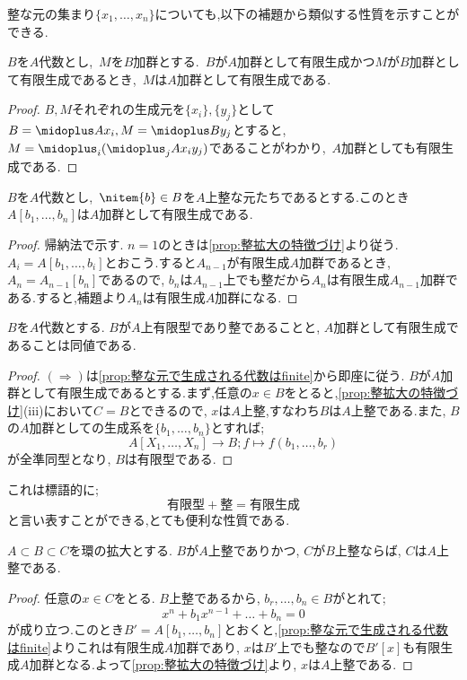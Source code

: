 整な元の集まり$\{x_1,\dots,x_n\}$についても,以下の補題から類似する性質を示すことができる.
\begin{lem}
	$B$を$A$代数とし,~$M$を$B$加群とする.~$B$が$A$加群として有限生成かつ$M$が$B$加群として有限生成であるとき,~$M$は$A$加群として有限生成である.
\end{lem}
\begin{proof}
	$B,M$それぞれの生成元を$\{x_i\},\{y_j\}$として$B=\midoplus Ax_i,M=\midoplus By_j$とすると,~$M=\midoplus_i (\midoplus_j Ax_iy_j)$であることがわかり,~$A$加群としても有限生成である. 
\end{proof}

\begin{prop}\label{prop:整な元で生成される代数はfinite}
	$B$を$A$代数とし,~$\nitem{b}\in B$を$A$上整な元たちであるとする.このとき$A[b_1,\dots,b_n]$は$A$加群として有限生成である.
\end{prop}
\begin{proof}
	帰納法で示す. $n=1$のときは\ref{prop:整拡大の特徴づけ}より従う. $A_i=A[b_1,\dots,b_i]$とおこう.すると$A_{n-1}$が有限生成$A$加群であるとき, $A_n=A_{n-1}[b_n]$であるので, $b_n$は$A_{n-1}$上でも整だから$A_n$は有限生成$A_{n-1}$加群である.すると,補題より$A_n$は有限生成$A$加群になる.
\end{proof}

\begin{prop}
	$B$を$A$代数とする. $B$が$A$上有限型であり整であることと, $A$加群として有限生成であることは同値である.
\end{prop}

\begin{proof}
	$(\Longrightarrow)$は\ref{prop:整な元で生成される代数はfinite}から即座に従う. $B$が$A$加群として有限生成であるとする.まず,任意の$x\in B$をとると,\ref{prop:整拡大の特徴づけ}(iii)において$C=B$とできるので, $x$は$A$上整,すなわち$B$は$A$上整である.また, $B$の$A$加群としての生成系を$\{b_1,\dots,b_n\}$とすれば;
	\[A[X_1,\dots,X_n]\to B;f\mapsto f(b_1,\dots,b_r)\]
	が全準同型となり, $B$は有限型である.
\end{proof}

これは標語的に;
\[\text{有限型}+\text{整}=\text{有限生成}\]
と言い表すことができる,とても便利な性質である.

\begin{prop}[整従属の推移性]
	$A\subset B\subset C$を環の拡大とする. $B$が$A$上整でありかつ, $C$が$B$上整ならば, $C$は$A$上整である.
\end{prop}

\begin{proof}
	任意の$x\in C$をとる. $B$上整であるから, $b_r,\dots, b_n\in B$がとれて;
	\[x^n+b_1x^{n-1}+\dots+b_n=0\]
	が成り立つ.このとき$B'=A[b_1,\dots,b_n]$とおくと,\ref{prop:整な元で生成される代数はfinite}よりこれは有限生成$A$加群であり, $x$は$B'$上でも整なので$B'[x]$も有限生成$A$加群となる.よって\ref{prop:整拡大の特徴づけ}より, $x$は$A$上整である.
\end{proof}
